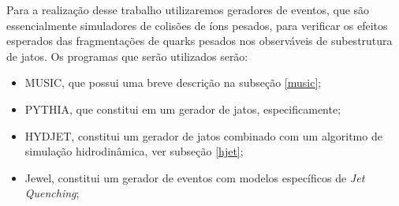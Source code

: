 Para a realização desse trabalho utilizaremos geradores de eventos, que são essencialmente simuladores
de colisões de íons pesados, para verificar os efeitos esperados das fragmentações de quarks pesados
nos observáveis de subestrutura de jatos. Os programas que serão utilizados serão:

\begin{itemize}
 \item MUSIC\cite{noauthor_music_nodate}, que possui uma breve descrição na subseção \ref{music};
 \item PYTHIA\cite{noauthor_pythia_nodate}, que constitui em um gerador de jatos, especificamente;
 \item HYDJET\cite{lokhtin_hydjet++_2009}, constitui um gerador de jatos combinado com um algoritmo de simulação hidrodinâmica, ver subseção \ref{hjet};
 \item Jewel\cite{noauthor_jewel_nodate, zapp_jewel_2014}, constitui um gerador de eventos com modelos específicos de \emph{Jet Quenching};
\end{itemize}
